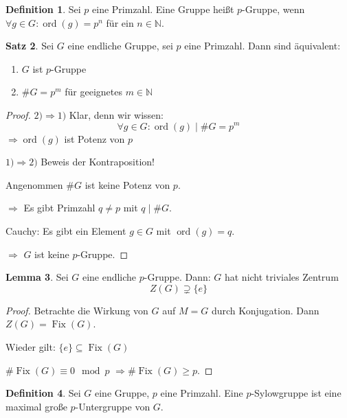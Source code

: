 \documentclass[12pt,parskip=full]{scrartcl}
\newcommand{\setN}{\mathbb{N}}
\newcommand{\heading}{\underline}
\theoremstyle{definition}
\newtheorem{theorem}{Satz}[section]
\newtheorem{lemma}[theorem]{Lemma}
\newtheorem{definition}[theorem]{Definition}
\theoremstyle{remark}
\begin{document}
	\begin{definition}
		Sei $p$ eine Primzahl. Eine Gruppe heißt $p$-Gruppe, wenn $\forall g \in G: \operatorname{ord}(g) = p^n$ für ein $n \in \setN$.
	\end{definition}

	\begin{theorem}
		Sei $G$ eine endliche Gruppe, sei $p$ eine Primzahl. Dann sind äquivalent:
		\begin{enumerate}
			\item $G$ ist $p$-Gruppe
			\item $\#G = p^m$ für geeignetes $m \in \setN$
		\end{enumerate}
	\end{theorem}

	\begin{proof}
		\heading{$2) \Rightarrow 1)$} Klar, denn wir wissen:
		\begin{equation*}
			\forall g \in G: \operatorname{ord}(g) \mid \#G = p^m
		\end{equation*}
		$\Rightarrow \operatorname{ord}(g)$ ist Potenz von $p$
		
		\heading{$1) \Rightarrow 2)$} Beweis der Kontraposition!
		
		Angenommen $\#G$ ist keine Potenz von $p$.
		
		$\Rightarrow$ Es gibt Primzahl $q \neq p$ mit $q \mid \#G$.
		
		Cauchy: Es gibt ein Element $g \in G$ mit $\operatorname{ord}(g) = q$.
		
		$\Rightarrow$ $G$ ist keine $p$-Gruppe.
	\end{proof}

	\begin{lemma}
		Sei $G$ eine endliche $p$-Gruppe. Dann: $G$ hat nicht triviales Zentrum
		\begin{equation*}
			Z(G) \supsetneq \{ e \}
		\end{equation*}
	\end{lemma}

	\begin{proof}
		Betrachte die Wirkung von $G$ auf $M = G$ durch Konjugation. Dann $Z(G) = \operatorname{Fix}(G)$.
		
		Wieder gilt: $\{ e \} \subseteq \operatorname{Fix}(G)$
		
		$\#\operatorname{Fix}(G) \equiv 0 \mod p$ $\Rightarrow \#\operatorname{Fix}(G) \geq p$.
	\end{proof}

	\begin{definition}
		Sei $G$ eine Gruppe, $p$ eine Primzahl. Eine $p$-Sylowgruppe ist eine maximal große $p$-Untergruppe von $G$.
	\end{definition}
\end{document}
